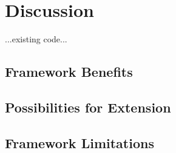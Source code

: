 
\chapter{Discussion\label{chap:discussion}}

...existing code...

\section{Framework Benefits}


\section{Possibilities for Extension}


\section{Framework Limitations}

